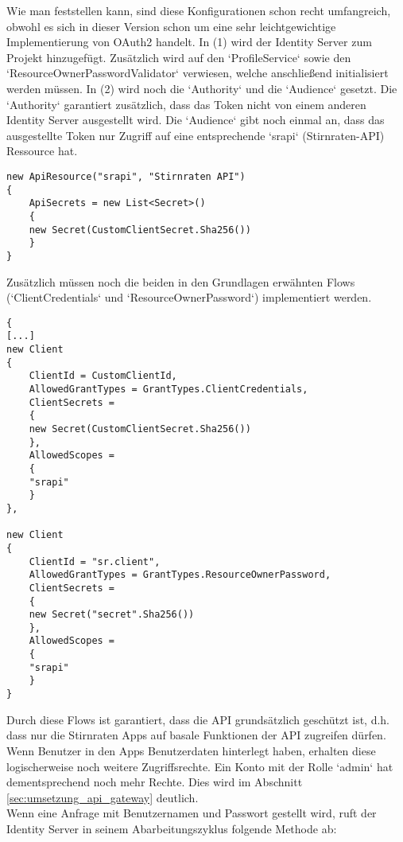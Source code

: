 Wie man feststellen kann, sind diese Konfigurationen schon recht umfangreich, obwohl es sich in dieser Version schon um eine sehr leichtgewichtige Implementierung von OAuth2 handelt. In (1) wird der Identity Server zum Projekt hinzugefügt. Zusätzlich wird auf den `ProfileService` sowie den `ResourceOwnerPasswordValidator` verwiesen, welche anschließend initialisiert werden müssen. In (2) wird noch die `Authority` und die `Audience` gesetzt. Die `Authority` garantiert zusätzlich, dass das Token nicht von einem anderen Identity Server ausgestellt wird. Die `Audience` gibt noch einmal an, dass das ausgestellte Token nur Zugriff auf eine entsprechende `srapi` (Stirnraten-API) Ressource hat. 

\begin{verbatim}
new ApiResource("srapi", "Stirnraten API")
{
    ApiSecrets = new List<Secret>()
    {
    new Secret(CustomClientSecret.Sha256())
    }
}
\end{verbatim}

Zusätzlich müssen noch die beiden in den Grundlagen erwähnten Flows (`ClientCredentials` und `ResourceOwnerPassword`) implementiert werden. 

\begin{verbatim}{
[...]
new Client
{
    ClientId = CustomClientId,
    AllowedGrantTypes = GrantTypes.ClientCredentials,
    ClientSecrets =
    {
    new Secret(CustomClientSecret.Sha256())
    },
    AllowedScopes =
    {
    "srapi"
    }
},

new Client
{
    ClientId = "sr.client",
    AllowedGrantTypes = GrantTypes.ResourceOwnerPassword,
    ClientSecrets =
    {
    new Secret("secret".Sha256())
    },
    AllowedScopes =
    {
    "srapi"
    }
}

\end{verbatim}

Durch diese Flows ist garantiert, dass die API grundsätzlich geschützt ist, d.h. dass nur die Stirnraten Apps auf basale Funktionen der API zugreifen dürfen.  Wenn Benutzer in den Apps Benutzerdaten hinterlegt haben, erhalten diese logischerweise noch weitere Zugriffsrechte. Ein Konto mit der Rolle `admin` hat dementsprechend noch mehr Rechte. Dies wird im Abschnitt \ref{sec:umsetzung_api_gateway} deutlich. \\

Wenn eine Anfrage mit Benutzernamen und Passwort gestellt wird, ruft der Identity Server in seinem Abarbeitungszyklus folgende Methode ab: 

